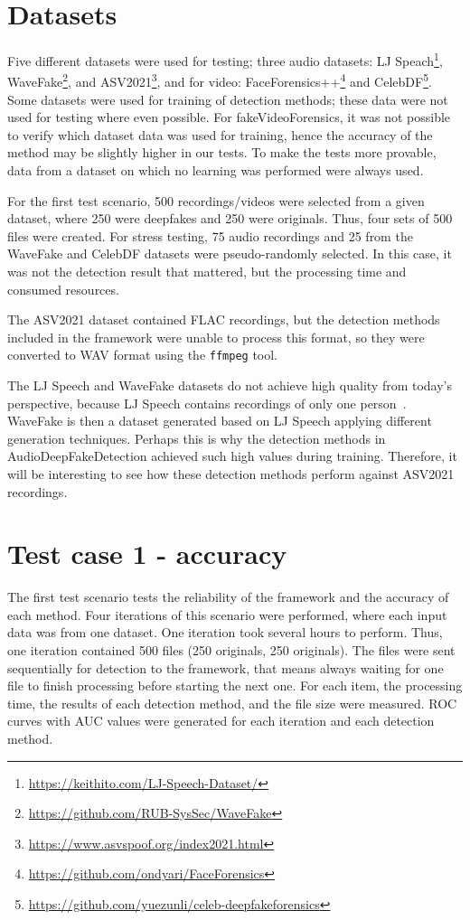 \section{Datasets}
\label{section:datasets}

Five different datasets were used for testing; three audio datasets: LJ Speach\footnote{\url{https://keithito.com/LJ-Speech-Dataset/}}, WaveFake\footnote{\url{https://github.com/RUB-SysSec/WaveFake}}, and ASV2021\footnote{\url{https://www.asvspoof.org/index2021.html}}, and for video: FaceForensics++\footnote{\url{https://github.com/ondyari/FaceForensics}} and CelebDF\footnote{\url{https://github.com/yuezunli/celeb-deepfakeforensics}}. Some datasets were used for training of detection methods; these data were not used for testing where even possible. For fakeVideoForensics, it was not possible to verify which dataset data was used for training, hence the accuracy of the method may be slightly higher in our tests. To make the tests more provable, data from a dataset on which no learning was performed were always used.

For the first test scenario, 500 recordings/videos were selected from a given dataset, where 250 were deepfakes and 250 were originals. Thus, four sets of 500 files were created. For stress testing, 75 audio recordings and 25 from the WaveFake and CelebDF datasets were pseudo-randomly selected. In this case, it was not the detection result that mattered, but the processing time and consumed resources.

The ASV2021 dataset contained FLAC recordings, but the detection methods included in the framework were unable to process this format, so they were converted to WAV format using the \texttt{ffmpeg} tool.

The LJ Speech and WaveFake datasets do not achieve high quality from today's perspective, because LJ Speech contains recordings of only one person~\cite{ljspeech17}. WaveFake is then a dataset generated based on LJ Speech applying different generation techniques. Perhaps this is why the detection methods in AudioDeepFakeDetection achieved such high values during training. Therefore, it will be interesting to see how these detection methods perform against ASV2021 recordings.

\section{Test case 1 - accuracy}

The first test scenario tests the reliability of the framework and the accuracy of each method. Four iterations of this scenario were performed, where each input data was from one dataset. One iteration took several hours to perform. Thus, one iteration contained 500 files (250 originals, 250 originals). The files were sent sequentially for detection to the framework, that means always waiting for one file to finish processing before starting the next one. For each item, the processing time, the results of each detection method, and the file size were measured. ROC curves with AUC values were generated for each iteration and each detection method.

